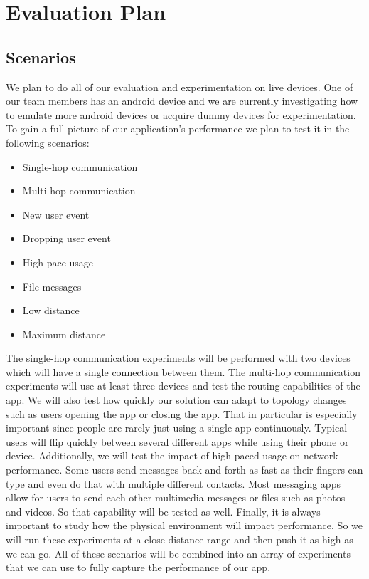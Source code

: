 \documentclass[10pt]{article}
\begin{document}
\newpage

\section{Evaluation Plan}
\subsection{Scenarios}

We plan to do all of our evaluation and experimentation on live devices. One of our team members has an android device and we are currently investigating how to emulate more android devices or acquire dummy devices for experimentation. To gain a full picture of our application's performance we plan to test it in the following scenarios:

\begin{itemize}
    \item Single-hop communication
    \item Multi-hop communication
    \item New user event
    \item Dropping user event
    \item High pace usage
    \item File messages
    \item Low distance
    \item Maximum distance
\end{itemize}

The single-hop communication experiments will be performed with two devices which will have a single connection between them. The multi-hop communication experiments will use at least three devices and test the routing capabilities of the app. We will also test how quickly our solution can adapt to topology changes such as users opening the app or closing the app. That in particular is especially important since people are rarely just using a single app continuously. Typical users will flip quickly between several different apps while using their phone or device. Additionally, we will test the impact of high paced usage on network performance. Some users send messages back and forth as fast as their fingers can type and even do that with multiple different contacts. Most messaging apps allow for users to send each other multimedia messages or files such as photos and videos. So that capability will be tested as well. Finally, it is always important to study how the physical environment will impact performance. So we will run these experiments at a close distance range and then push it as high as we can go. All of these scenarios will be combined into an array of experiments that we can use to fully capture the performance of our app.
\end{document}
